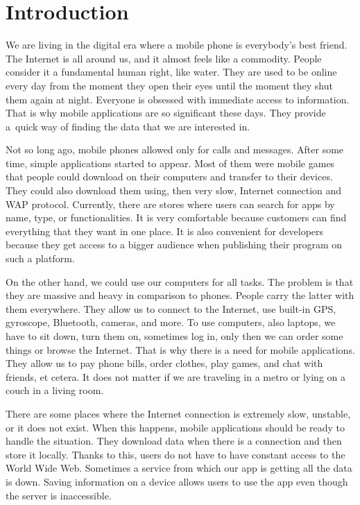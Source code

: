 \chapter{Introduction}
We are living in the digital era where a mobile phone is everybody's best friend. The Internet is all around us, and it almost feels like a commodity. People consider it a fundamental human right, like water. They are used to be online every day from the moment they open their eyes until the moment they shut them again at night. Everyone is obsessed with immediate access to information. That is why mobile applications are so significant these days. They provide a~quick way of finding the data that we are interested in. 

Not so long ago, mobile phones allowed only for calls and messages. After some time, simple applications started to appear. Most of them were mobile games that people could download on their computers and transfer to their devices. They could also download them using, then very slow, Internet connection and WAP protocol. Currently, there are stores where users can search for apps by name, type, or functionalities. It is very comfortable because customers can find everything that they want in one place. It is also convenient for developers because they get access to a bigger audience when publishing their program on such a platform.

On the other hand, we could use our computers for all tasks. The problem is that they are massive and heavy in comparison to phones. People carry the latter with them everywhere. They allow us to connect to the Internet, use built-in GPS, gyroscope, Bluetooth, cameras, and more. To use computers, also laptops, we have to sit down, turn them on, sometimes log in, only then we can order some things or browse the Internet. That is why there is a need for mobile applications. They allow us to pay phone bills, order clothes, play games, and chat with friends, et cetera. It does not matter if we are traveling in a metro or lying on a couch in a living room.

There are some places where the Internet connection is extremely slow, unstable, or it does not exist. When this happens, mobile applications should be ready to handle the situation. They download data when there is a connection and then store it locally. Thanks to this, users do not have to have constant access to the World Wide Web. Sometimes a service from which our app is getting all the data is down. Saving information on a device allows users to use the app even though the server is inaccessible.

